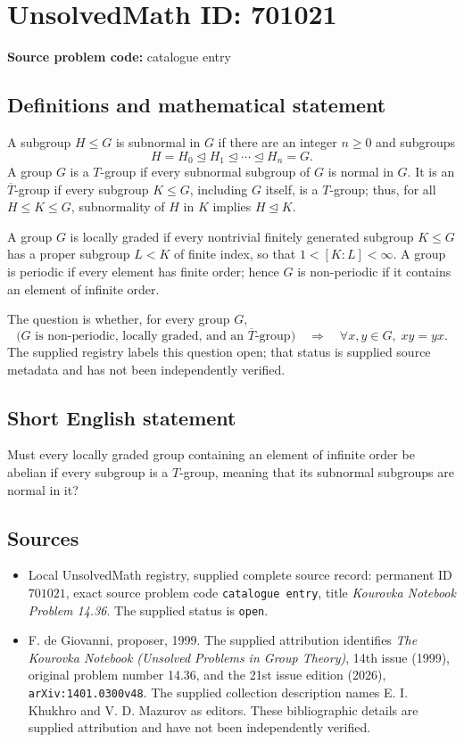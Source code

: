 \documentclass[11pt]{article}
\begin{document}
\section*{UnsolvedMath ID: 701021}
\textbf{Source problem code:} catalogue entry
\subsection{Definitions and mathematical statement}
A subgroup \(H\leq G\) is subnormal in \(G\) if there are an integer \(n\geq 0\) and subgroups
\[
H=H_0\trianglelefteq H_1\trianglelefteq\cdots\trianglelefteq H_n=G.
\]
A group \(G\) is a \(T\)-group if every subnormal subgroup of \(G\) is normal in \(G\). It is an \(\overline{T}\)-group if every subgroup \(K\leq G\), including \(G\) itself, is a \(T\)-group; thus, for all \(H\leq K\leq G\), subnormality of \(H\) in \(K\) implies \(H\trianglelefteq K\).

A group \(G\) is locally graded if every nontrivial finitely generated subgroup \(K\leq G\) has a proper subgroup \(L<K\) of finite index, so that \(1<[K:L]<\infty\). A group is periodic if every element has finite order; hence \(G\) is non-periodic if it contains an element of infinite order.

The question is whether, for every group \(G\),
\[
\bigl(G\text{ is non-periodic, locally graded, and an }\overline{T}\text{-group}\bigr)
\quad\Longrightarrow\quad
\forall x,y\in G,\;xy=yx.
\]
The supplied registry labels this question open; that status is supplied source metadata and has not been independently verified.
\subsection{Short English statement}
Must every locally graded group containing an element of infinite order be abelian if every subgroup is a \(T\)-group, meaning that its subnormal subgroups are normal in it?
\subsection{Sources}
\begin{itemize}
\item Local UnsolvedMath registry, supplied complete source record: permanent ID \(701021\), exact source problem code \texttt{catalogue entry}, title \emph{Kourovka Notebook Problem 14.36}. The supplied status is \texttt{open}.
\item F. de Giovanni, proposer, 1999. The supplied attribution identifies \emph{The Kourovka Notebook (Unsolved Problems in Group Theory)}, 14th issue (1999), original problem number 14.36, and the 21st issue edition (2026), \texttt{arXiv:1401.0300v48}. The supplied collection description names E. I. Khukhro and V. D. Mazurov as editors. These bibliographic details are supplied attribution and have not been independently verified.
\end{itemize}
\end{document}
